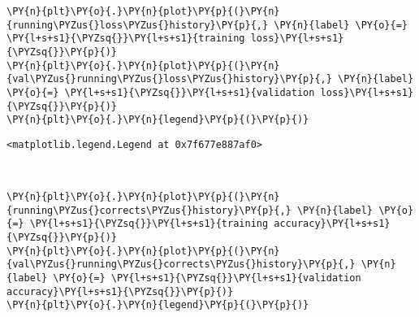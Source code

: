     \begin{tcolorbox}[breakable, size=fbox, boxrule=1pt, pad at break*=1mm,colback=cellbackground, colframe=cellborder]
\begin{Verbatim}[commandchars=\\\{\}]
\PY{n}{plt}\PY{o}{.}\PY{n}{plot}\PY{p}{(}\PY{n}{running\PYZus{}loss\PYZus{}history}\PY{p}{,} \PY{n}{label} \PY{o}{=} \PY{l+s+s1}{\PYZsq{}}\PY{l+s+s1}{training loss}\PY{l+s+s1}{\PYZsq{}}\PY{p}{)}
\PY{n}{plt}\PY{o}{.}\PY{n}{plot}\PY{p}{(}\PY{n}{val\PYZus{}running\PYZus{}loss\PYZus{}history}\PY{p}{,} \PY{n}{label} \PY{o}{=} \PY{l+s+s1}{\PYZsq{}}\PY{l+s+s1}{validation loss}\PY{l+s+s1}{\PYZsq{}}\PY{p}{)}
\PY{n}{plt}\PY{o}{.}\PY{n}{legend}\PY{p}{(}\PY{p}{)}
\end{Verbatim}
\end{tcolorbox}

            \begin{tcolorbox}[breakable, size=fbox, boxrule=.5pt, pad at break*=1mm, opacityfill=0]
\begin{Verbatim}[commandchars=\\\{\}]
<matplotlib.legend.Legend at 0x7f677e887af0>
\end{Verbatim}
\end{tcolorbox}
        
    \begin{center}
    \end{center}
    { \hspace*{\fill} \\}
    
    \begin{tcolorbox}[breakable, size=fbox, boxrule=1pt, pad at break*=1mm,colback=cellbackground, colframe=cellborder]
\begin{Verbatim}[commandchars=\\\{\}]
\PY{n}{plt}\PY{o}{.}\PY{n}{plot}\PY{p}{(}\PY{n}{running\PYZus{}corrects\PYZus{}history}\PY{p}{,} \PY{n}{label} \PY{o}{=} \PY{l+s+s1}{\PYZsq{}}\PY{l+s+s1}{training accuracy}\PY{l+s+s1}{\PYZsq{}}\PY{p}{)}
\PY{n}{plt}\PY{o}{.}\PY{n}{plot}\PY{p}{(}\PY{n}{val\PYZus{}running\PYZus{}corrects\PYZus{}history}\PY{p}{,} \PY{n}{label} \PY{o}{=} \PY{l+s+s1}{\PYZsq{}}\PY{l+s+s1}{validation accuracy}\PY{l+s+s1}{\PYZsq{}}\PY{p}{)}
\PY{n}{plt}\PY{o}{.}\PY{n}{legend}\PY{p}{(}\PY{p}{)}
\end{Verbatim}
\end{tcolorbox}

